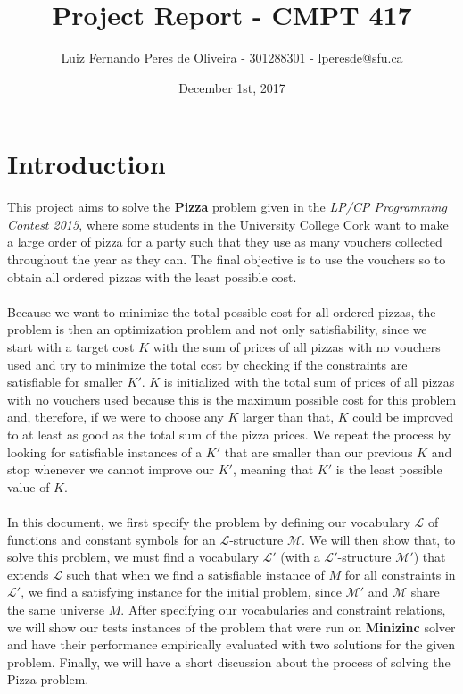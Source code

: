 \documentclass[conference]{IEEEtran}
\title{Project Report - CMPT 417}
\author{Luiz Fernando Peres de Oliveira - 301288301 - lperesde@sfu.ca}
\date{December 1st, 2017}
\newcommand\tab[1][0.3cm]{\hspace*{#1}}
\begin{document}
\maketitle
\section{Introduction}
This project aims to solve the \textbf{Pizza} problem given in the \textit{LP/CP Programming Contest 2015}, where some students in the University College Cork want to make a large order of pizza for a party such that they use as many vouchers collected throughout the year as they can. The final objective is to use the vouchers so to obtain all ordered pizzas with the least possible cost.
\\
\\
\tab Because we want to minimize the total possible cost for all ordered pizzas, the problem is then an optimization problem and not only satisfiability, since we start with a target cost $K$ with the sum of prices of all pizzas with no vouchers used and try to minimize the total cost by checking if the constraints are satisfiable for smaller $K'$. $K$ is initialized with the total sum of prices of all pizzas with no vouchers used because this is the maximum possible cost for this problem and, therefore, if we were to choose any $K$ larger than that, $K$ could be improved to at least as good as the total sum of the pizza prices. We repeat the process by looking for satisfiable instances of a $K'$ that are smaller than our previous $K$ and stop whenever we cannot improve our $K'$, meaning that $K'$ is the least possible value of $K$.
\\
\\
\tab In this document, we first specify the problem by defining our vocabulary $\mathcal{L}$ of functions and constant symbols for an $\mathcal{L}$-structure $\mathcal{M}$. We will then show that, to solve this problem, we must find a vocabulary $\mathcal{L'}$ (with a $\mathcal{L'}$-structure $\mathcal{M'}$) that extends $\mathcal{L}$ such that when we find a satisfiable instance of $M$ for all constraints in $\mathcal{L'}$, we find a satisfying instance for the initial problem, since $\mathcal{M'}$ and $\mathcal{M}$ share the same universe $M$. After specifying our vocabularies and constraint relations, we will show our tests instances of the problem that were run on \textbf{Minizinc} solver and have their performance empirically evaluated with two solutions for the given problem. Finally, we will have a short discussion about the process of solving the Pizza problem.
\end{document}
